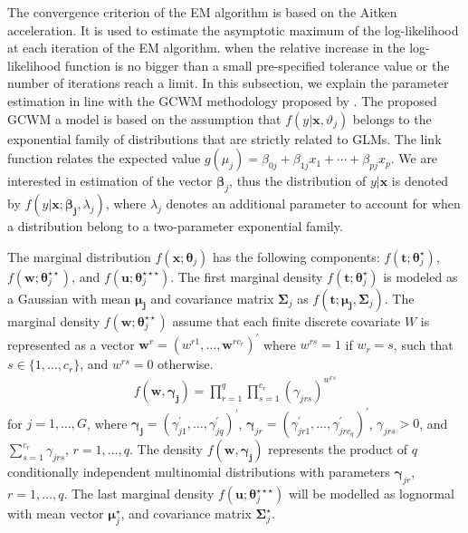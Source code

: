 \documentclass[11pt,letterpaper]{article}
\numberwithin{equation}{section}
\numberwithin{equation}{section}
\numberwithin{equation}{section}
\begin{document}
The convergence criterion of the EM algorithm is based on the Aitken acceleration. It is used to estimate the asymptotic maximum of the log-likelihood at each iteration of the EM algorithm.  when the relative increase in the log-likelihood function is no bigger than a small pre-specified tolerance value or the number of iterations reach a limit. %
In this subsection, we explain the parameter estimation in line with the GCWM methodology proposed by \cite{Ingrassia+Punzo+Vittadini+Minotti:2015}. The proposed GCWM a model is based on the assumption that $f(y|\bm{x},\vartheta_j)$ belongs to the exponential family of distributions that are strictly related to GLMs. The link function relates the expected value $g(\mu_j)= \beta_{0j} + \beta_{1j} x_{1}+ \cdots+\beta_{pj} x_{p}$. We are interested in estimation of the vector $\bm \beta_j$, thus the distribution of $y|\bm{x}$ is denoted by $f(y|\bm{x}; \bm{\beta_j}, \lambda_j)$, where $\lambda_j$ denotes an additional parameter to account for when a distribution belong to a two-parameter exponential family.

The marginal distribution $f(\bm{x}; \bm \theta_j)$ has the following components: $f(\bm{t}; \bm \theta_j^{\star})$, $f(\bm{w}; \bm \theta_j^{\star\star})$, and $f(\bm{u};\bm \theta_{j}^{\star\star\star})$. The first marginal density $f(\bm{t}; \bm \theta_j^{\star})$ is modeled as a  Gaussian with mean $\bm {\mu_j}$ and covariance matrix $\bm \Sigma_j$ as $f(\bm t; \bm {\mu_j}, \bm \Sigma_j)$. The marginal density $f(\bm{w};\bm \theta_{j}^{\star\star})$ assume that each finite discrete covariate $W$ is represented as a vector $\bm{w}^r=(w^{r1},\ldots,\bm{w}^{rc_r})^{'}$ where $w^{rs}=1$ if $w_r = s$, such that $s\in\{1, \ldots, c_r\}$, %
and $w^{rs}=0$ otherwise.
\begin{align}
f(\bm {w}, \bm {\gamma_j})=\prod_{r=1}^{q}\prod_{s=1}^{c_r}(\gamma_{jrs} )^{w^{rs}} 
\label{eq31}
\end{align}
for $j=1, \ldots, G$, where $\bm {\gamma_j}=(\gamma_{j1}^{'}, \ldots, \gamma_{jq}^{'})^{'}$, $\bm \gamma_{jr}=(\gamma_{jr1}^{'}, \ldots, \gamma_{jrc_q}^{'})^{'}$, $\gamma_{jrs} > 0$, and  $\sum_{s=1}^{c_r}\gamma_{jrs}$, $r=1,\ldots,q$. The density $f(\bm {w}, \bm{\gamma_j})$ represents the product of $q$ conditionally independent multinomial distributions with parameters $\bm{\gamma}_{jr}$, $r=1,\ldots, q$. The last marginal density $f(\bm{u};\bm \theta_{j}^{\star\star\star})$ will be modelled as lognormal with mean vector $ \bm \mu_j^\star$, and covariance matrix $\bm \Sigma_j^\star $. 
\end{document}
